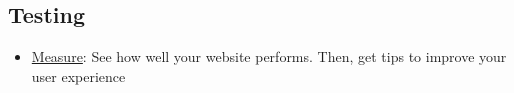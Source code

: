 \subsection{Testing}

\begin{itemize}[leftmargin=*]
    \item \href{https://web.dev/measure/}{Measure}: See how well your website performs. Then, get tips to improve your user experience
\end{itemize}

